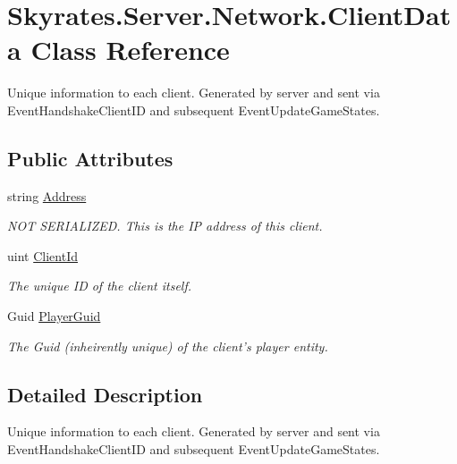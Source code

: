 \hypertarget{class_skyrates_1_1_server_1_1_network_1_1_client_data}{\section{Skyrates.\-Server.\-Network.\-Client\-Data Class Reference}
\label{class_skyrates_1_1_server_1_1_network_1_1_client_data}
}


Unique information to each client. Generated by server and sent via Event\-Handshake\-Client\-I\-D and subsequent Event\-Update\-Game\-States.  


\subsection*{Public Attributes}
\begin{DoxyCompactItemize}
\item 
string \hyperlink{class_skyrates_1_1_server_1_1_network_1_1_client_data_a09baae028286a5c98135e9a247d5c27c}{Address}
\begin{DoxyCompactList}\small\item\em N\-O\-T S\-E\-R\-I\-A\-L\-I\-Z\-E\-D. This is the I\-P address of this client. \end{DoxyCompactList}\item 
uint \hyperlink{class_skyrates_1_1_server_1_1_network_1_1_client_data_aac65d3f831d9663be5dc72fe934ac8ea}{Client\-Id}
\begin{DoxyCompactList}\small\item\em The unique I\-D of the client itself. \end{DoxyCompactList}\item 
Guid \hyperlink{class_skyrates_1_1_server_1_1_network_1_1_client_data_acce52e282ee92f76cb67afa116469ebb}{Player\-Guid}
\begin{DoxyCompactList}\small\item\em The Guid (inheirently unique) of the client's player entity. \end{DoxyCompactList}\end{DoxyCompactItemize}


\subsection{Detailed Description}
Unique information to each client. Generated by server and sent via Event\-Handshake\-Client\-I\-D and subsequent Event\-Update\-Game\-States. 



